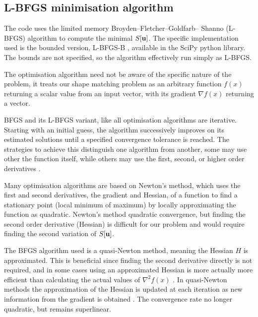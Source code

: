 \documentclass[a4paper, 12pt]{article}
\begin{document}
\subsection{L-BFGS minimisation algorithm}

The code uses the limited memory Broyden--Fletcher--Goldfarb-- Shanno (L-BFGS) \cite{byrd1995limited}
algorithm to compute the minimal $S[\mathbf{u}]$. The specific implementation used
is the bounded version, L-BFGS-B \cite{zhu1997algorithm}, available in the SciPy
python library. The bounds are not specified, so the algorithm effectively run
simply as L-BFGS.

The optimisation algorithm need not be aware of the specific nature of the
problem, it treats our shape matching problem as an arbitrary function $f(x)$
returning a scalar value from an input vector, with its gradient $\nabla f(x)$ returning a vector.

BFGS and its L-BFGS variant, like all optimisation algorithms are
iterative. Starting with an initial guess, the algorithm successively improves
on its estimated solutions until a specified convergence tolerance is
reached. The strategies to achieve this distinguish one algorithm from another,
some may use other the function itself, while others may use the first, second,
or higher order derivatives \cite{nocedal1999numerical}.

Many optimisation algorithms are based on Newton's method, which uses the first
and second derivatives, the gradient and Hessian, of a function to find a
stationary point (local minimum of maximum) by locally approximating the
function as quadratic. Newton's method quadratic convergence, but finding
 the second order derivative (Hessian) is difficult for our
 problem and would require finding the second variation of $S[\mathbf{u}]$.

 The BFGS algorithm used is a quasi-Newton method, meaning the Hessian $H$ is
 approximated. This is beneficial since finding the second derivative directly
 is not required, and in some cases using an approximated Hessian is more
 actually more efficient than calculating the actual values of $\nabla^2 f(x)$
 \cite{nocedal1999numerical}. In quasi-Newton methods the approximation of the
 Hessian is updated at each iteration as new information from the gradient is
 obtained \cite{nocedal1999numerical}. The convergence rate no longer quadratic,
 but remains superlinear.

\end{document}
